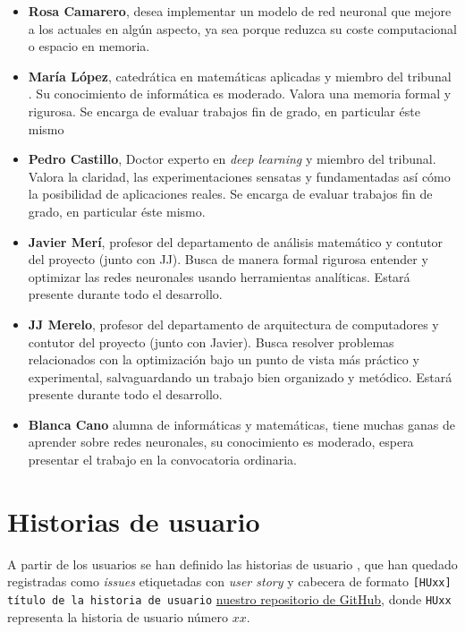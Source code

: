 \begin{itemize}

    \item \textbf{Rosa Camarero}, desea implementar un modelo de red neuronal que mejore a los actuales en algún aspecto, ya sea porque reduzca su coste computacional o espacio en memoria. 

    \item \textbf{María López}, catedrática en matemáticas aplicadas y miembro del tribunal . Su conocimiento
    de informática es moderado. Valora una memoria formal y rigurosa. Se encarga de evaluar trabajos fin de grado, en particular éste mismo
    
    \item \textbf{Pedro Castillo}, Doctor experto en \textit{deep learning} y miembro del tribunal. Valora la claridad, las experimentaciones sensatas y fundamentadas así cómo la posibilidad de aplicaciones reales. Se encarga de evaluar trabajos fin de grado, en particular éste mismo. 
    
    \item \textbf{Javier Merí}, profesor del departamento de análisis matemático y contutor del proyecto (junto con JJ). Busca de manera formal rigurosa entender y optimizar las redes neuronales usando herramientas analíticas. Estará presente durante todo el desarrollo. 
    
    \item   \textbf{JJ Merelo}, profesor del departamento de arquitectura de computadores y contutor del proyecto (junto con Javier). 
    Busca resolver problemas relacionados con la optimización bajo un punto de vista más práctico y experimental, salvaguardando un trabajo bien organizado y metódico. Estará presente durante todo el desarrollo. 

    \item \textbf{Blanca Cano} alumna de informáticas y matemáticas, tiene muchas ganas de aprender sobre redes 
    neuronales, su conocimiento es moderado, espera presentar el trabajo en la convocatoria ordinaria. 

\end{itemize}

\section{Historias de usuario}   \label{ch:metodología_personas_historias_de_usuario}

A partir de los usuarios se han definido las historias de usuario \cite{UserStories}, que han quedado registradas 
como \textit{issues} etiquetadas con \textit{user story} y cabecera de formato
\texttt{[HUxx] título de la historia de usuario} \href{https://github.com/BlancaCC/TFG-Estudio-de-las-redes-neuronales}{nuestro repositorio 
de GitHub},
 donde \texttt{HUxx} representa
la historia de usuario número $xx$.   

